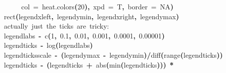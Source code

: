\documentclass[a4paper]{article}
\newcommand{\hlnumber}[1]{\textcolor[rgb]{0.0823529411764706,0.0784313725490196,0.709803921568627}{#1}}%
\newcommand{\hlfunctioncall}[1]{\textcolor[rgb]{1,0,0}{#1}}%
\newcommand{\hlkeyword}[1]{\textcolor[rgb]{0,0,0}{\textbf{#1}}}%
\newcommand{\hlargument}[1]{\textcolor[rgb]{0.694117647058824,0.247058823529412,0.0196078431372549}{#1}}%
\newcommand{\hlcomment}[1]{\textcolor[rgb]{0.8,0.8,0.8}{#1}}%
\newcommand{\hlassignement}[1]{\textcolor[rgb]{0.215686274509804,0.215686274509804,0.384313725490196}{\textbf{#1}}}%
\newcommand{\hlsymbol}[1]{\textcolor[rgb]{0,0,0}{#1}}%
\newcommand{\hlprompt}[1]{\textcolor[rgb]{0,0,0}{#1}}%
\newcommand{\hlstd}[1]{\textcolor[rgb]{0,0,0}{#1}}%
\newenvironment{Houtput}{\raggedright}{%
%
}
\begin{document}
\begin{Houtput}
\hlstd{}\hlprompt{{\ }}{\ }{\ }{\ }{\ }\hlargument{col}{\ }\hlargument{=}{\ }\hlfunctioncall{heat.colors}\hlkeyword{(}\hlnumber{20}\hlkeyword{)}\hlkeyword{,}{\ }\hlargument{xpd}{\ }\hlargument{=}{\ }\hlsymbol{T}\hlkeyword{,}{\ }\hlargument{border}{\ }\hlargument{=}{\ }\hlnumber{NA}\hlkeyword{)}\mbox{}
\normalfont
\hspace*{\fill}\\
\hlstd{}\ttfamily\noindent
\hlprompt{\usebox{\hlnormalsizeboxgreaterthan}{\ }}\hlfunctioncall{rect}\hlkeyword{(}\hlsymbol{legendxleft}\hlkeyword{,}{\ }\hlsymbol{legendymin}\hlkeyword{,}{\ }\hlsymbol{legendxright}\hlkeyword{,}{\ }\hlsymbol{legendymax}\hlkeyword{)}\mbox{}
\normalfont
\hspace*{\fill}\\
\hlstd{}\ttfamily\noindent
\hlprompt{\usebox{\hlnormalsizeboxgreaterthan}{\ }}\hlcomment{\usebox{\hlnormalsizeboxhash}{\ }actually{\ }just{\ }the{\ }ticks{\ }are{\ }tricky:}\mbox{}
\normalfont
\hspace*{\fill}\\
\hlstd{}\ttfamily\noindent
\hlprompt{\usebox{\hlnormalsizeboxgreaterthan}{\ }}\hlsymbol{legendlabs}{\ }\hlassignement{\usebox{\hlnormalsizeboxlessthan}-}{\ }\hlfunctioncall{c}\hlkeyword{(}\hlnumber{1}\hlkeyword{,}{\ }\hlnumber{0.1}\hlkeyword{,}{\ }\hlnumber{0.01}\hlkeyword{,}{\ }\hlnumber{0.001}\hlkeyword{,}{\ }\hlnumber{0.0001}\hlkeyword{,}{\ }\hlnumber{0.00001}\hlkeyword{)}\mbox{}
\normalfont
\hspace*{\fill}\\
\hlstd{}\ttfamily\noindent
\hlprompt{\usebox{\hlnormalsizeboxgreaterthan}{\ }}\hlsymbol{legendticks}{\ }\hlassignement{\usebox{\hlnormalsizeboxlessthan}-}{\ }\hlfunctioncall{log}\hlkeyword{(}\hlsymbol{legendlabs}\hlkeyword{)}\mbox{}
\normalfont
\hspace*{\fill}\\
\hlstd{}\ttfamily\noindent
\hlprompt{\usebox{\hlnormalsizeboxgreaterthan}{\ }}\hlsymbol{legendticksscale}{\ }\hlassignement{\usebox{\hlnormalsizeboxlessthan}-}{\ }\hlkeyword{(}\hlsymbol{legendymax}{\ }\hlkeyword{-}{\ }\hlsymbol{legendymin}\hlkeyword{)}\hlkeyword{/}\hlfunctioncall{diff}\hlkeyword{(}\hlfunctioncall{range}\hlkeyword{(}\hlsymbol{legendticks}\hlkeyword{)}\hlkeyword{)}\mbox{}
\normalfont
\hspace*{\fill}\\
\hlstd{}\ttfamily\noindent
\hlprompt{\usebox{\hlnormalsizeboxgreaterthan}{\ }}\hlsymbol{legendticks}{\ }\hlassignement{\usebox{\hlnormalsizeboxlessthan}-}{\ }\hlkeyword{(}\hlsymbol{legendticks}{\ }\hlkeyword{+}{\ }\hlfunctioncall{abs}\hlkeyword{(}\hlfunctioncall{min}\hlkeyword{(}\hlsymbol{legendticks}\hlkeyword{)}\hlkeyword{)}\hlkeyword{)}{\ }\hlkeyword{*}\hspace*{\fill}\\

\end{Houtput}
\end{document}
